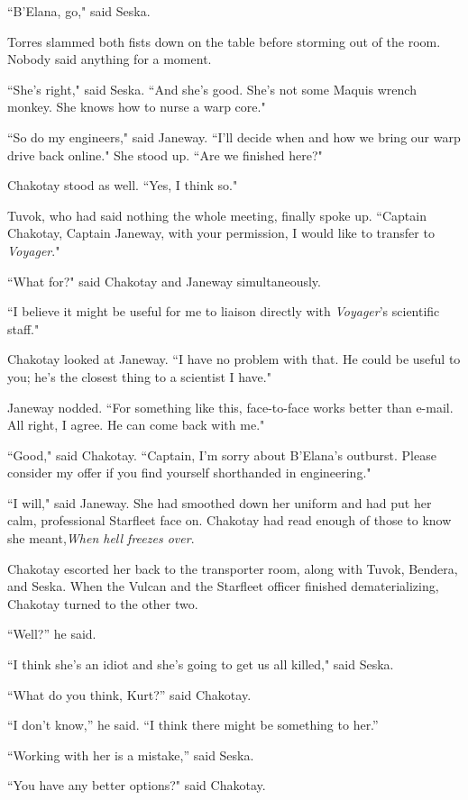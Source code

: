 \documentclass[twoside,letterpaper,12pt]{memoir}
\begin{document}
``B'Elana, go," said Seska.

Torres slammed both fists down on the table before storming out of the room. Nobody said anything for a moment.

``She's right," said Seska. ``And she's good. She's not some Maquis wrench monkey. She knows how to nurse a warp core."

``So do my engineers," said Janeway. ``I'll decide when and how we bring our warp drive back online." She stood up. ``Are we finished here?"

Chakotay stood as well. ``Yes, I think so."

Tuvok, who had said nothing the whole meeting, finally spoke up. ``Captain Chakotay, Captain Janeway, with your permission, I would like to transfer to \textit{Voyager}."

``What for?" said Chakotay and Janeway simultaneously.

``I believe it might be useful for me to liaison directly with \textit{Voyager}'s scientific staff."

Chakotay looked at Janeway. ``I have no problem with that. He could be useful to you; he's the closest thing to a scientist I have."

Janeway nodded. ``For something like this, face-to-face works better than e-mail. All right, I agree. He can come back with me."

``Good," said Chakotay. ``Captain, I'm sorry about B'Elana's outburst. Please consider my offer if you find yourself shorthanded in engineering."

``I will," said Janeway. She had smoothed down her uniform and had put her calm, professional Starfleet face on. Chakotay had read enough of those to know she meant,\textit{When hell freezes over}.

Chakotay escorted her back to the transporter room, along with Tuvok, Bendera, and Seska. When the Vulcan and the Starfleet officer finished dematerializing, Chakotay turned to the other two.

``Well?'' he said.

``I think she's an idiot and she's going to get us all killed," said Seska.

``What do you think, Kurt?'' said Chakotay.

``I don’t know,'' he said. ``I think there might be something to her.''

``Working with her is a mistake,'' said Seska.

``You have any better options?" said Chakotay.
\end{document}
